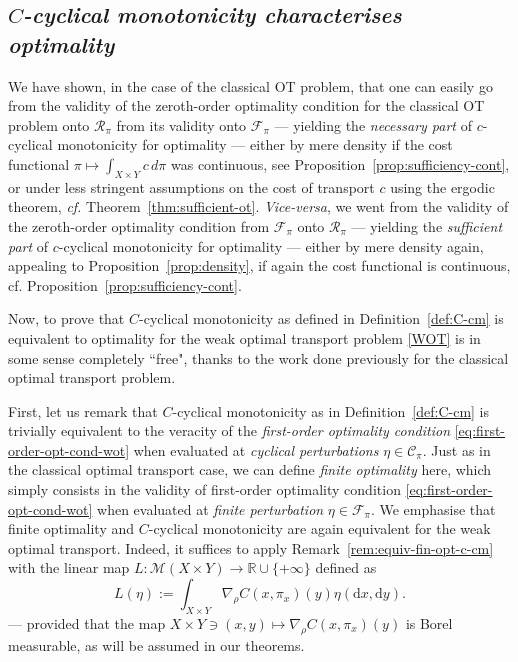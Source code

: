 \documentclass[leqno, 11pt, a4paper]{amsart}
\theoremstyle{definition}
\newcommand{\cR}{\mathcal{R}}
\newcommand{\cC}{\mathcal{C}}
\newcommand{\R}{\mathbb{R}}
\newcommand{\cF}{\mathcal{F}}
\newcommand{\cM}{\mathcal{M}}
\newcommand{\dd}{\mathrm{d}}
\newcommand{\extendedR}{\R \cup \{+\infty\}}
\begin{document}
\subsection{\textit{$C$-cyclical monotonicity characterises optimality}}
We have shown, in the case of the classical OT problem, that one can easily go from the validity of the zeroth-order optimality condition for the classical OT problem onto $\cR_\pi$ from its validity onto $\cF_\pi$ — yielding the \textit{necessary part} of $c$-cyclical monotonicity for optimality — either by mere density if the cost functional $\pi \mapsto \int_{X \times Y} c \, d \pi$ was continuous, see Proposition~\ref{prop:sufficiency-cont}, or under less stringent assumptions on the cost of transport $c$ using the ergodic theorem, \textit{cf.} Theorem~\ref{thm:sufficient-ot}. \textit{Vice-versa}, we went from the validity of the zeroth-order optimality condition from $\cF_\pi$ onto $\cR_\pi$ — yielding the \textit{sufficient part }of $c$-cyclical monotonicity for optimality — either by mere density again, appealing to Proposition~\ref{prop:density}, if again the cost functional is continuous, cf. Proposition~\ref{prop:sufficiency-cont}.

Now, to prove that $C$-cyclical monotonicity as defined in Definition~\ref{def:C-cm} is equivalent to optimality for the weak optimal transport problem \eqref{WOT} is  in some sense completely ``free", thanks to the work done previously for the classical optimal transport problem.

First, let us remark that $C$-cyclical monotonicity as in Definition~\ref{def:C-cm} is trivially equivalent to the veracity of the \textit{first-order optimality condition} \eqref{eq:first-order-opt-cond-wot} when evaluated at \textit{cyclical perturbations} $\eta \in \cC_\pi$. Just as in the classical optimal transport case, we can define \textit{finite optimality} here, which simply consists in the validity of first-order optimality condition \eqref{eq:first-order-opt-cond-wot} when evaluated at \textit{finite perturbation} $\eta \in \cF_\pi$. We emphasise that finite optimality and $C$-cyclical monotonicity are again equivalent for the weak optimal transport. Indeed, it suffices to apply Remark~\ref{rem:equiv-fin-opt-c-cm} with the linear map $L : \cM(X \times Y) \to \extendedR$ defined as
$$
L(\eta) := \int_{X \times Y} \nabla_\rho C(x, \pi_x)(y) \eta(\dd x, \dd y).
$$
--- provided that the map $X \times Y \ni (x,y) \mapsto \nabla_\rho C(x, \pi_x)(y)$ is Borel measurable, as will be assumed in our theorems. 
\end{document}
